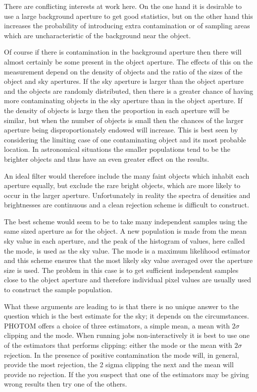 \documentclass[twoside,11pt,nolof]{starlink}
\begin{document}
There are conflicting interests at work here. On the one hand it is
desirable to use a large background aperture to get good statistics, but
on the other hand this increases the probability of introducing extra
contamination or of sampling areas which are uncharacteristic of the
background near the object.

Of course if there is contamination in the background aperture then there
will almost certainly be some present in the object aperture. The effects
of this on the measurement depend on the density of objects and the ratio
of the sizes of the object and sky apertures. If the sky aperture is
larger than the object aperture and the objects are randomly distributed,
then there is a greater chance of having more contaminating objects in the
sky aperture than in the object aperture.
If the density of objects is large then the proportion in each aperture will
be similar, but when the number of objects is small then the chances of
the larger aperture being disproportionately endowed will increase. This
is best seen by considering the limiting case of one contaminating object
and its most probable location. In astronomical situations the smaller
populations tend to be the brighter objects and thus have an even greater
effect on the results.

An ideal filter would therefore include the many faint objects which
inhabit each aperture equally, but exclude the rare bright objects, which
are more likely to occur in the larger aperture. Unfortunately in reality
the spectra of densities and brightnesses are continuous and a clean
rejection scheme is difficult to construct.

The best scheme would seem to be to take many independent samples
using the same sized aperture as for the object. A new population is made
from the mean sky value in each aperture, and the peak of the histogram of
values, here called the mode, is used as the sky value. The mode is a
maximum likelihood estimator and this scheme ensures that the most likely
sky value averaged over the aperture size is used.
The problem in this case
is to get sufficient independent samples close to the object aperture and
therefore individual pixel values are usually used to construct the
sample population.

What these arguments are leading to is that there is no unique answer to
the question which is the best estimate for the sky; it depends on the
circumstances.
PHOTOM offers a choice of three estimators, a simple mean, a mean with
$2\sigma$ clipping and the mode.
When running jobs non-interactively it is best to use one of the estimators
that performs clipping: either the mode or the mean with $2\sigma$ rejection.
In the presence of positive contamination the mode will, in general,
provide the most rejection, the 2 sigma clipping the next and the mean
will provide no rejection. If the you suspect that one of the
estimators may be giving wrong results then try one of the
others.
\end{document}
